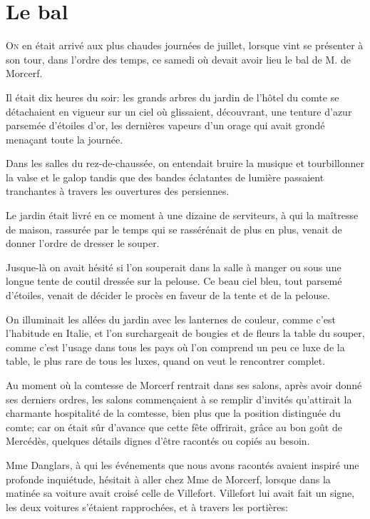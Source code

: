 \chapter{Le bal}

\lettrine{O}{n} en était arrivé aux plus chaudes journées de juillet, lorsque vint se présenter à son tour, dans l'ordre des temps, ce samedi où devait avoir lieu le bal de M. de Morcerf. 

\zz
Il était dix heures du soir: les grands arbres du jardin de l'hôtel du comte se détachaient en vigueur sur un ciel où glissaient, découvrant, une tenture d'azur parsemée d'étoiles d'or, les dernières vapeurs d'un orage qui avait grondé menaçant toute la journée. 

Dans les salles du rez-de-chaussée, on entendait bruire la musique et tourbillonner la valse et le galop tandis que des bandes éclatantes de lumière passaient tranchantes à travers les ouvertures des persiennes. 

Le jardin était livré en ce moment à une dizaine de serviteurs, à qui la maîtresse de maison, rassurée par le temps qui se rassérénait de plus en plus, venait de donner l'ordre de dresser le souper. 

Jusque-là on avait hésité si l'on souperait dans la salle à manger ou sous une longue tente de coutil dressée sur la pelouse. Ce beau ciel bleu, tout parsemé d'étoiles, venait de décider le procès en faveur de la tente et de la pelouse. 

On illuminait les allées du jardin avec les lanternes de couleur, comme c'est l'habitude en Italie, et l'on surchargeait de bougies et de fleurs la table du souper, comme c'est l'usage dans tous les pays où l'on comprend un peu ce luxe de la table, le plus rare de tous les luxes, quand on veut le rencontrer complet. 

Au moment où la comtesse de Morcerf rentrait dans ses salons, après avoir donné ses derniers ordres, les salons commençaient à se remplir d'invités qu'attirait la charmante hospitalité de la comtesse, bien plus que la position distinguée du comte; car on était sûr d'avance que cette fête offrirait, grâce au bon goût de Mercédès, quelques détails dignes d'être racontés ou copiés au besoin. 

Mme Danglars, à qui les événements que nous avons racontés avaient inspiré une profonde inquiétude, hésitait à aller chez Mme de Morcerf, lorsque dans la matinée sa voiture avait croisé celle de Villefort. Villefort lui avait fait un signe, les deux voitures s'étaient rapprochées, et à travers les portières: 

